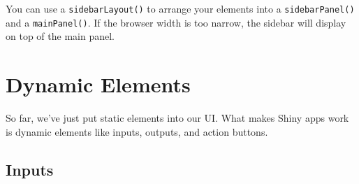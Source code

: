 \documentclass[
  oneside]{book}
\newenvironment{Shaded}{\begin{snugshade}}{\end{snugshade}}
\newcommand{\AttributeTok}[1]{\textcolor[rgb]{0.77,0.63,0.00}{#1}}
\newcommand{\FunctionTok}[1]{\textcolor[rgb]{0.00,0.00,0.00}{#1}}
\newcommand{\NormalTok}[1]{#1}
\newcommand{\OtherTok}[1]{\textcolor[rgb]{0.56,0.35,0.01}{#1}}
\newcommand{\SpecialCharTok}[1]{\textcolor[rgb]{0.00,0.00,0.00}{#1}}
\newcommand{\StringTok}[1]{\textcolor[rgb]{0.31,0.60,0.02}{#1}}
\begin{document}
You can use a \texttt{sidebarLayout}\texttt{()} to arrange your elements into a \texttt{sidebarPanel}\texttt{()} and a \texttt{mainPanel}\texttt{()}. If the browser width is too narrow, the sidebar will display on top of the main panel.

\begin{Shaded}
\end{Shaded}

\hypertarget{dynamic-elements}{%
\section{Dynamic Elements}\label{dynamic-elements}}

So far, we've just put static elements into our UI. What makes Shiny apps work is dynamic elements like inputs, outputs, and action buttons.

\hypertarget{inputs-intro}{%
\subsection{Inputs}\label{inputs-intro}}
\end{document}
